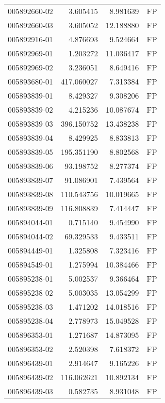 \begin{tabular}{lrrl}
005892660-02 &    3.605415 &       8.981639 &   FP \\
005892660-03 &    3.605052 &      12.188880 &   FP \\
005892916-01 &    4.876693 &       9.524664 &   FP \\
005892969-01 &    1.203272 &      11.036417 &   FP \\
005892969-02 &    3.236051 &       8.649416 &   FP \\
005893680-01 &  417.060027 &       7.313384 &   FP \\
005893839-01 &    8.429327 &       9.308206 &   FP \\
005893839-02 &    4.215236 &      10.087674 &   FP \\
005893839-03 &  396.150752 &      13.438238 &   FP \\
005893839-04 &    8.429925 &       8.833813 &   FP \\
005893839-05 &  195.351190 &       8.802568 &   FP \\
005893839-06 &   93.198752 &       8.277374 &   FP \\
005893839-07 &   91.086901 &       7.439564 &   FP \\
005893839-08 &  110.543756 &      10.019665 &   FP \\
005893839-09 &  116.808839 &       7.414447 &   FP \\
005894044-01 &    0.715140 &       9.454990 &   FP \\
005894044-02 &   69.329533 &       9.433511 &   FP \\
005894449-01 &    1.325808 &       7.323416 &   FP \\
005894549-01 &    1.275994 &      10.384466 &   FP \\
005895238-01 &    5.002537 &       9.366464 &   FP \\
005895238-02 &    5.003035 &      13.054299 &   FP \\
005895238-03 &    1.471202 &      14.018516 &   FP \\
005895238-04 &    2.778973 &      15.049528 &   FP \\
005896353-01 &    1.271687 &      14.873095 &   FP \\
005896353-02 &    2.520398 &       7.618372 &   FP \\
005896439-01 &    2.914647 &       9.165226 &   FP \\
005896439-02 &  116.062621 &      10.892134 &   FP \\
005896439-03 &    0.582735 &       8.931048 &   FP \\

\end{tabular}
